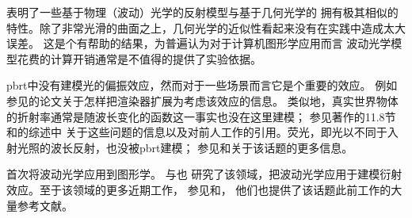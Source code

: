 \citet{85654}表明了一些基于物理（波动）光学的反射模型与基于几何光学的
拥有极其相似的特性。除了非常光滑的曲面之上，几何光学的近似性看起来没有在实践中造成太大误差。
这是个有帮助的结果，为普遍认为对于计算机图形学应用而言
波动光学模型花费的计算开销通常是不值得的提供了实验依据。

pbrt中没有建模光的偏振效应，然而对于一些场景而言它是个重要的效应。
例如参见\citet{10.1145/192161.192204}的论文关于怎样把渲染器扩展为考虑该效应的信息。
类似地，真实世界物体的折射率通常是随波长变化的函数这一事实也没在这里建模；
参见\citet{GLASSNER1995}著作的11.8节和\citet{10.2312:egst.20021054}的综述中
关于这些问题的信息以及对前人工作的引用。荧光，即光以不同于入射光照的波长反射，也没被pbrt建模；
参见\citet{10.1007/978-3-642-87825-1_5}和\citet{10.1145/1174429.1174484}关于该话题的更多信息。

\citet{10.1145/800224.806817}首次将波动光学应用到图形学。
\citet{BaharChakrabarti1987}与\citet{10.1145/311535.311546}也
研究了该领域，把波动光学应用于建模衍射效应。至于该领域的更多近期工作，
参见\citet{10.1145/2231816.2231820}和\citet{10.1111/cgf.12012}，
他们也提供了该话题此前工作的大量参考文献。
